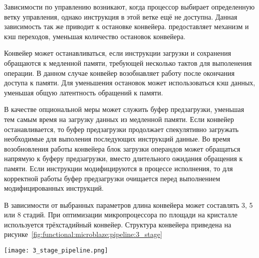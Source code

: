 Зависимости по управлению возникают, когда процессор выбирает определенную ветку управления, однако инструкция
в этой ветке ещё не доступна. Данная зависимость так же приводит к остановке конвейера.  предоставляет
механизм  и кэш переходов, уменьшая количество остановок конвейера.

Конвейер может останавливаться, если инструкции загрузки и сохранения обращаются к медленной памяти, требующей
несколько тактов для выполенения операции. В данном случае конвейер возобнавляет работу после окончания доступа к
памяти. Для уменьшения остановок может использоваться кэш данных, уменьшая общую латентность обращений к памяти.

В качестве опциональной меры может служить буфер предзагрузки, уменьшая тем самым время на загрузку данных из
медленной памяти. Если конвейер останавливается, то буфер предзагрузки продолжает спекулятивно загружать необходимые
для выполения последующих инструкций данные. Во время возобновления работы конвейера блок загрузки операндов может
обращаться напрямую к буферу предзагрузки, вместо длительного ожидания обращения к памяти. Если инструкции модифицируются
в процессе исполнения, то для корректной работы буфер предзагрузки очищается перед выполнением модифицированных инструкций.

В зависимости от выбранных параметров длина конвейера может составлять 3, 5 или 8 стадий.
При оптимизации микропроцессора по площади на кристалле используется трёхстадийный конвейер. Структура конвейера
приведена на рисунке~\ref{fig:functional:microblaze:pipeline:3_stage}

\begin{center}
  \centering
  \texttt{[image: 3\_stage\_pipeline.png]}
  \label{fig:functional:microblaze:pipeline:3_stage}
\end{center}
